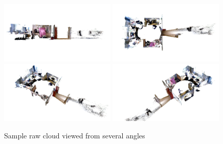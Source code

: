 \documentclass[11pt,a4paper]{kth-mag}
\begin{document}
\begin{figure}
  \centering
  \includegraphics[width=0.49\textwidth]{images/orig_side}
  \includegraphics[width=0.49\textwidth]{images/orig_top}
  \includegraphics[width=0.49\textwidth]{images/orig_diag_left}
  \includegraphics[width=0.49\textwidth]{images/orig_diag_right}
  \caption{Sample raw cloud viewed from several angles}
  \label{fig:orig}
\end{figure}
\end{document}
